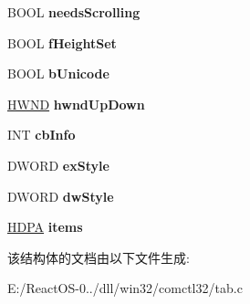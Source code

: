 \begin{DoxyCompactItemize}
\item 
\mbox{\label{struct_t_a_b___i_n_f_o_ad2d267d925cdac663aa01e73b8cb46a2}} 
B\+O\+OL {\bfseries needs\+Scrolling}
\item 
\mbox{\label{struct_t_a_b___i_n_f_o_a86dcceb3a314824757190fab270d2107}} 
B\+O\+OL {\bfseries f\+Height\+Set}
\item 
\mbox{\label{struct_t_a_b___i_n_f_o_a2238b33513379553035ad2dc8ba39092}} 
B\+O\+OL {\bfseries b\+Unicode}
\item 
\mbox{\label{struct_t_a_b___i_n_f_o_a780627f76d33d01a0cd60a4f8a4c834b}} 
\hyperlink{interfacevoid}{H\+W\+ND} {\bfseries hwnd\+Up\+Down}
\item 
\mbox{\label{struct_t_a_b___i_n_f_o_a977ccf44f7ef34c04c38f896d30a1f06}} 
I\+NT {\bfseries cb\+Info}
\item 
\mbox{\label{struct_t_a_b___i_n_f_o_a177e7b4cce9ff8a4aa7f087d562e8437}} 
D\+W\+O\+RD {\bfseries ex\+Style}
\item 
\mbox{\label{struct_t_a_b___i_n_f_o_af77442781164079150906c9730bd8a83}} 
D\+W\+O\+RD {\bfseries dw\+Style}
\item 
\mbox{\label{struct_t_a_b___i_n_f_o_a475de4ddfec48e98a7b8d2c0034c4977}} 
\hyperlink{struct___d_p_a}{H\+D\+PA} {\bfseries items}
\end{DoxyCompactItemize}


该结构体的文档由以下文件生成\+:\begin{DoxyCompactItemize}
\item 
E\+:/\+React\+O\+S-\/0../dll/win32/comctl32/tab.\+c\end{DoxyCompactItemize}

